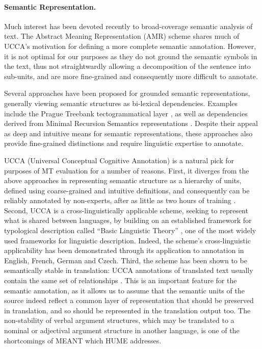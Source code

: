 \documentclass[11pt]{article}
\begin{document}
\paragraph{Semantic Representation.}
Much interest has been devoted recently to broad-coverage semantic analysis of text.
The Abstract Meaning Representation (AMR) scheme \cite{banarescu2013abstract}
shares much of UCCA's motivation for defining a more complete semantic annotation.
However, it is not optimal for our purposes as they do not ground the semantic symbols
in the text, thus not straightwardly allowing a decomposition of the sentence into sub-units,
and are more fine-grained and consequently more difficult to annotate.

Several approaches have been proposed for grounded semantic representations,
generally viewing semantic structures as bi-lexical dependencies. Examples include
the Prague Treebank tectogrammatical layer \cite{hajic2012announcing}, as well as dependencies derived
from Minimal Recursion Semantics representations \cite{oepen2006discriminant}.
Despite their appeal as deep and intuitive means for semantic representations,
these approaches also provide fine-grained distinctions and require linguistic expertise to annotate.

UCCA (Universal Conceptual Cognitive Annotation) is a natural pick for purposes of MT evaluation
for a number of reasons. 
First, it diverges from the above approaches in representing
semantic structure as a hierarchy of units, defined using coarse-grained and intuitive definitions,
and consequently can be reliably annotated by non-experts, after as little as two hours
of training \cite{marinotti2014}.
Second, UCCA is a cross-linguistically applicable scheme, seeking to represent what is shared between languages,
by building on an established framework for typological description called
``Basic Linguistic Theory'' \cite[BLT]{Dixon:10a,Dixon:10b,Dixon:12},
one of the most widely used frameworks for linguistic description.
Indeed, the scheme's cross-linguistic applicability has been demonstrated through its
application to annotation in English, French, German and Czech. 
Third, the scheme has been shown to be semantically stable
in translation: UCCA annotations of translated text usually contain the same set of relationships
\cite{sulem2012}. This is an important feature for the semantic annotation, as it allows us to
assume that the semantic units of the source indeed reflect a common layer of representation that
should be preserved in translation, and so should be represented in the translation output too.
The non-stability of verbal argument structures, which may be translated to a nominal or adjectival
argument structure in another language, is one of the shortcomings of MEANT which HUME addresses.
\end{document}
